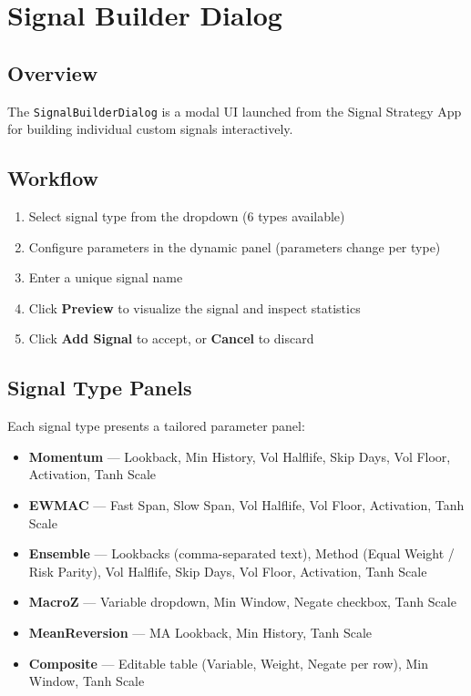 \documentclass[11pt,a4paper]{article}
\begin{document}
\section{Signal Builder Dialog}

\subsection{Overview}
The \texttt{SignalBuilderDialog} is a modal UI launched from the Signal Strategy App for building individual custom signals interactively.

\subsection{Workflow}
\begin{enumerate}[leftmargin=2em]
  \item Select signal type from the dropdown (6 types available)
  \item Configure parameters in the dynamic panel (parameters change per type)
  \item Enter a unique signal name
  \item Click \textbf{Preview} to visualize the signal and inspect statistics
  \item Click \textbf{Add Signal} to accept, or \textbf{Cancel} to discard
\end{enumerate}

\subsection{Signal Type Panels}
Each signal type presents a tailored parameter panel:
\begin{itemize}[leftmargin=2em]
  \item \textbf{Momentum} --- Lookback, Min History, Vol Halflife, Skip Days, Vol Floor, Activation, Tanh Scale
  \item \textbf{EWMAC} --- Fast Span, Slow Span, Vol Halflife, Vol Floor, Activation, Tanh Scale
  \item \textbf{Ensemble} --- Lookbacks (comma-separated text), Method (Equal Weight / Risk Parity), Vol Halflife, Skip Days, Vol Floor, Activation, Tanh Scale
  \item \textbf{MacroZ} --- Variable dropdown, Min Window, Negate checkbox, Tanh Scale
  \item \textbf{MeanReversion} --- MA Lookback, Min History, Tanh Scale
  \item \textbf{Composite} --- Editable table (Variable, Weight, Negate per row), Min Window, Tanh Scale
\end{itemize}
\newpage
\end{document}
